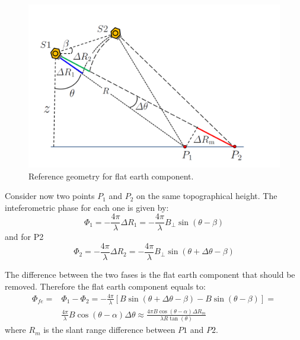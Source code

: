 \begin{figure}[H]
    \centering
    \includegraphics[width=\linewidth]{Cap1/flat.png}
    \caption{Reference geometry for flat earth component. \cite{Paolathesis}}
    \label{fig:flat_earth_component}
\end{figure}

Consider now two points $P_1$ and $P_2$ on the same topographical height. The inteferometric phase for each one is given by:
\begin{equation}
    \Phi_1 = -\frac{4\pi}{\lambda}\Delta R_1 = -\frac{4\pi}{\lambda}B_{\perp}\sin(\theta - \beta)
\end{equation}
and for P2
\begin{equation}
    \Phi_2 = -\frac{4\pi}{\lambda}\Delta R_2 = -\frac{4\pi}{\lambda}B_{\perp}\sin(\theta + \Delta \theta - \beta)
\end{equation}

The difference between the two fases is the flat earth component that should be removed. Therefore the flat earth component equals to:
\begin{equation}
    \begin{aligned}
        \Phi_{fe} = & \Phi_1 - \Phi_2 = -\frac{4\pi}{\lambda}[B\sin(\theta + \Delta \theta - \beta) - B\sin(\theta - \beta)] = \\ 
        & \frac{4\pi}{\lambda}B\cos(\theta - \alpha)\Delta \theta
        \approx \frac{4\pi B\cos(\theta - \alpha)\Delta R_m}{\lambda R \tan(\theta)}
    \end{aligned}
\end{equation}
where $R_m$ is the slant range difference between $P1$ and $P2$.

